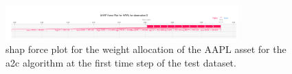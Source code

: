 \begin{figure}
    \centering
    \includegraphics[width=0.8\textwidth]{figures/a2c_shap_forceplot_singleobs_aapl.png}
    \caption{\acrshort{shap} force plot for the weight allocation of the AAPL asset for the \acrshort{a2c} algorithm at the first time step of the test dataset.}
    \label{fig:a2c_shap_forceplot_singleobs_aapl}
\end{figure}